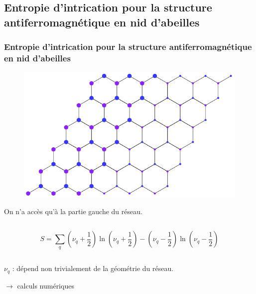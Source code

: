 \documentclass[xcolor=dvipsnames]{beamer}
\newcommand{\1}{\ensuremath{\ket{\om_1\bom_1}}\xspace}
\newcommand{\2}{\ensuremath{\ket{\om_2\bom_2}}\xspace}
\begin{document}
\subsection{Entropie d'intrication pour la structure antiferromagnétique en nid d'abeilles}
\begin{frame}
\frametitle{Entropie d'intrication pour la structure antiferromagnétique en nid d'abeilles}
\begin{figure}[htp]
\centering
\includegraphics[scale=0.50]{vector_img/systeme_calculs.pdf}
\end{figure}
On n'a accès qu'à la partie gauche du réseau.

\begin{columns}
  \begin{column}{12cm}
  \begin{alertblock}{}
  	\begin{equation}
	S=\sum_{q} \left(\nu_q+\frac{1}{2}\right)\ln \left(\nu_q+\frac{1}{2}\right)-\left(\nu_q-\frac{1}{2}\right)\ln \left(\nu_q-\frac{1}{2}\right)
	\end{equation}
  \end{alertblock}
  \end{column}
\end{columns}
$\nu_q$ : dépend non trivialement de la géométrie du réseau.

$\rightarrow$ calculs numériques 
\end{frame}
\end{document}
